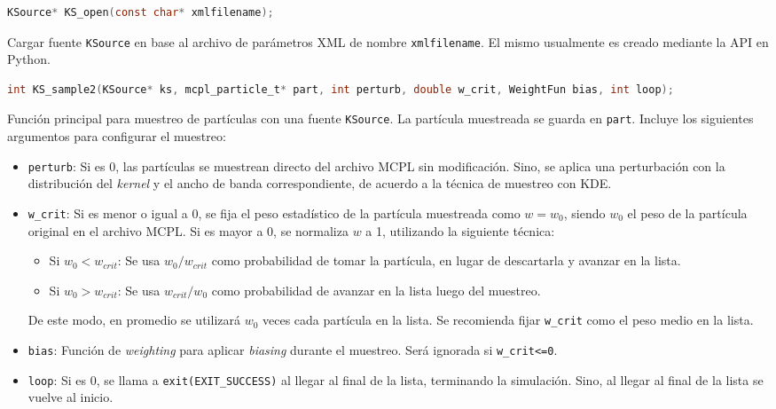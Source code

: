 \begin{footnotesize}
\begin{lstlisting}[language=C]
KSource* KS_open(const char* xmlfilename);
\end{lstlisting}
\begin{addmargin}[0.5cm]{0cm}
Cargar fuente \verb|KSource| en base al archivo de parámetros XML de nombre \verb|xmlfilename|. El mismo usualmente es creado mediante la API en Python.
\end{addmargin}

\begin{lstlisting}[language=C]
int KS_sample2(KSource* ks, mcpl_particle_t* part, int perturb, double w_crit, WeightFun bias, int loop);
\end{lstlisting}
\begin{addmargin}[0.5cm]{0cm}
Función principal para muestreo de partículas con una fuente \verb|KSource|. La partícula muestreada se guarda en \verb|part|. Incluye los siguientes argumentos para configurar el muestreo:
\begin{itemize}
	\item \verb|perturb|: Si es 0, las partículas se muestrean directo del archivo MCPL sin modificación. Sino, se aplica una perturbación con la distribución del \emph{kernel} y el ancho de banda correspondiente, de acuerdo a la técnica de muestreo con KDE.
	\item \verb|w_crit|: Si es menor o igual a 0, se fija el peso estadístico de la partícula muestreada como $w=w_0$, siendo $w_0$ el peso de la partícula original en el archivo MCPL. Si es mayor a 0, se normaliza $w$ a 1, utilizando la siguiente técnica:
	\begin{itemize}
		\item Si $w_0<w_{crit}$: Se usa $w_0/w_{crit}$ como probabilidad de tomar la partícula, en lugar de descartarla y avanzar en la lista.
		\item Si $w_0>w_{crit}$: Se usa $w_{crit}/w_0$ como probabilidad de avanzar en la lista luego del muestreo.
	\end{itemize}
	De este modo, en promedio se utilizará $w_0$ veces cada partícula en la lista. Se recomienda fijar \verb|w_crit| como el peso medio en la lista.
	\item \verb|bias|: Función de \emph{weighting} para aplicar \emph{biasing} durante el muestreo. Será ignorada si \verb|w_crit<=0|.
	\item \verb|loop|: Si es 0, se llama a \verb|exit(EXIT_SUCCESS)| al llegar al final de la lista, terminando la simulación. Sino, al llegar al final de la lista se vuelve al inicio.
\end{itemize}
\end{addmargin}


\end{footnotesize}
